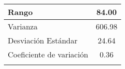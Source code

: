 \begin{footnotesize}
\begin{minipage}[!ht][9cm][b]{0.5\textwidth}
\begin{tabular}{lc}
            \midrule
            Rango & 84.00 \\
            \midrule
            Varianza & 606.98 \\
            \midrule
            Desviación Estándar & 24.64 \\
            \midrule
            Coeficiente de variación & 0.36 \\
            \bottomrule
            {} & {} \\
        \end{tabular}
        \label{tab:variableContinuaMedidasDispersion}
    \end{minipage}
\end{footnotesize}
\par